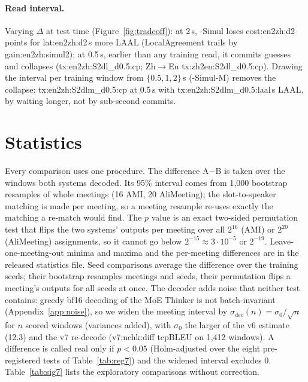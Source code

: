 



\paragraph{Read interval.} Varying $\Delta$ at test time (Figure~\ref{fig:tradeoff}): at 2\,s, \sys{}-Simul loses
\num{cost:en2zh:d2} points for \num{lat:en2zh:d2}\,s more LAAL (LocalAgreement trails by \num{gain:en2zh:simul2}); at
0.5\,s, earlier than any training read, it commits guesses and collapses (\num{tx:en2zh:S2dl_d0.5:cp};
Zh$\rightarrow$En \num{tx:zh2en:S2dl_d0.5:cp}). Drawing the
interval per training window from $\{0.5,1,2\}$\,s (\sys{}-Simul-M) removes the collapse: \num{tx:en2zh:S2dlm_d0.5:cp}
at 0.5\,s with \num{tx:en2zh:S2dlm_d0.5:laal}\,s LAAL, by waiting longer, not by sub-second commits.






\section{Statistics}
\label{app:sig}
\label{app:stats7}




Every comparison uses one procedure. The difference A$-$B is taken over the windows both systems decoded. Its 95\%
interval comes from 1{,}000 bootstrap resamples of whole meetings (16 AMI, 20 AliMeeting); the slot-to-speaker matching
is made per meeting, so a meeting resample re-uses exactly the matching a re-match would find. The $p$ value is an
exact two-sided permutation test that flips the two systems' outputs per meeting over all $2^{16}$ (AMI) or $2^{20}$
(AliMeeting) assignments, so it cannot go below $2^{-15}\approx3\cdot10^{-5}$ or $2^{-19}$. Leave-one-meeting-out
minima and maxima and the per-meeting differences are in the released statistics file. Seed comparisons average the
difference over the training seeds; their bootstrap resamples meetings and seeds, their permutation flips a meeting's
outputs for all seeds at once. The decoder adds noise that neither test contains: greedy bf16 decoding of the MoE Thinker
is not batch-invariant (Appendix~\ref{app:noise}), so we widen the meeting interval by
$\sigma_\text{dec}(n)=\sigma_0/\sqrt{n}$ for $n$ scored windows (variances added), with $\sigma_0$ the larger of the v6
estimate (12.3) and the v7 re-decode (\num{v7:nchk:diff} tcpBLEU on 1{,}412 windows). A difference is called real only if
$p<0.05$ (Holm-adjusted over the eight pre-registered tests of Table~\ref{tab:reg7}) and the widened interval excludes
0. Table~\ref{tab:sig7} lists the exploratory comparisons without correction.


